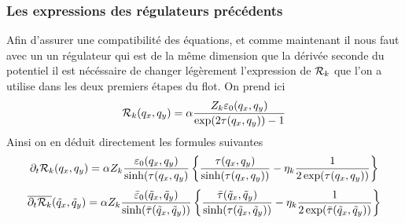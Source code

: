 \documentclass[10pt]{article}
\begin{document}
\vspace*{11pt}
\subsubsection{Les expressions des régulateurs précédents}

Afin d'assurer une compatibilité des équations, et comme maintenant il nous faut avec un un régulateur qui est de la même dimension que la dérivée seconde du potentiel il est nécéssaire de changer légèrement l'expression de $\mathcal{R}_k$ que l'on a utilise dans les deux premiers étapes du flot. On prend ici
\begin{equation}
\mathcal{R}_k(q_x, q_y) = \alpha \frac{Z_k \varepsilon_0(q_x, q_y)}{\exp(2\tau(q_x, q_y)) -1}
\end{equation}
Ainsi on en déduit directement les formules suivantes
\begin{equation}
\partial_t \mathcal{R}_k(q_x, q_y) = \alpha Z_k \frac{\varepsilon_0(q_x, q_y)}{\sinh(\tau(q_x, q_y)}   \left\{ \frac{\tau(q_x, q_y)}{\sinh(\tau(q_x, q_y))} - \eta_k \frac{1}{2\exp(\tau(q_x, q_y))} \right\}
\end{equation}
\begin{equation}
\overline{\partial_t \mathcal{R}_k}(\tilde{q}_x, \tilde{q}_y) = \alpha Z_k \frac{\bar{\varepsilon}_0(\tilde{q}_x, \tilde{q}_y)}{\sinh(\bar{\tau}(\tilde{q}_x, \tilde{q}_y))}   \left\{ \frac{\bar{\tau}(\tilde{q}_x, \tilde{q}_y)}{\sinh(\tau(\tilde{q}_x, \tilde{q}_y))} - \eta_k \frac{1}{2\exp(\bar{\tau}(\tilde{q}_x, \tilde{q}_y))} \right\}
\end{equation}
\end{document}
